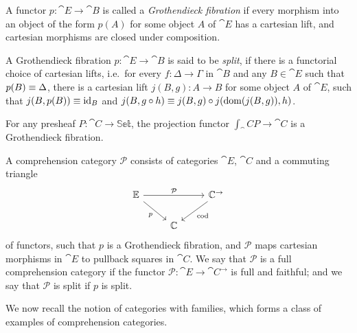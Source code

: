 \begin{defn}
A functor $p:\cat{E}\to\cat{B}$ is called a \emph{Grothendieck fibration} if
every morphism into an object of the form $p(A)$ for some object $A$ of $\cat{E}$ 
has a cartesian lift, and cartesian morphisms are closed under composition.
\end{defn}

\begin{defn}
A Grothendieck fibration $p:\cat{E}\to\cat{B}$ is said to be \emph{split}, if
there is a functorial choice of cartesian lifts, i.e.~for every $f:\Delta\to \Gamma$ in 
$\cat{B}$ and any $B\in \cat{E}$ such that $p(B)\equiv \Delta$,
there is a cartesian lift $j(B,g):A \to B$ for some object $A$ of $\cat{E}$, such that 
$j(B,p(B))\equiv{\mathrm{id}_{B}}$ and $j(B, g\circ h)\equiv j(B,g)\circ j(\mathrm{dom}(j(B,g)),h)$.
\end{defn}

\begin{eg}
For any presheaf $P:\cat{C}\to\mathbb{Set}$, the projection functor
$\int_\cat{C} P\to\cat{C}$ is a Grothendieck fibration.
\end{eg}

\begin{defn}
A comprehension category $\mathcal{P}$ consists of categories $\cat{E}$, $\cat{C}$ and a
commuting triangle
\begin{equation*}
\begin{tikzcd}
\cat{E} \arrow[rr,"\mathcal{P}"] \arrow[dr,swap,"p"] & & \cat{C}^{\to} \arrow[dl,"\mathrm{cod}"] \\
& \cat{C}
\end{tikzcd}
\end{equation*}
of functors, such that $p$ is a Grothendieck fibration, and $\mathcal{P}$ maps
cartesian morphisms in $\cat{E}$ to pullback squares in $\cat{C}$. We say that
$\mathcal{P}$ is a full comprehension category if the functor $\mathcal{P}:
\cat{E}\to\cat{C}^{\to}$ is full and faithful; and we say that
$\mathcal{P}$ is split if $p$ is split.
\end{defn}

We now recall the notion of categories with families, which forms a class of
examples of comprehension categories. 

